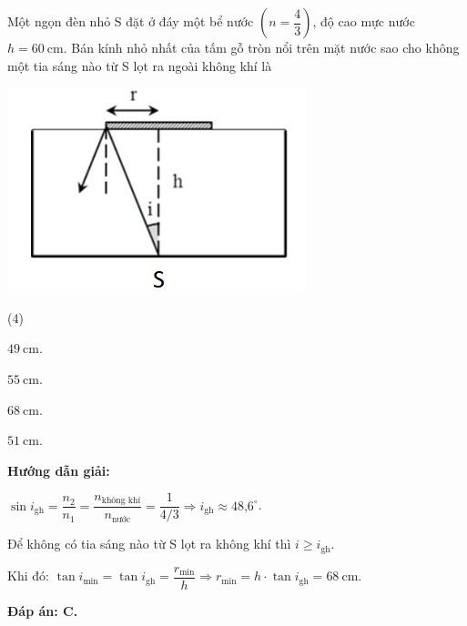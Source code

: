 {Một ngọn đèn nhỏ S đặt ở đáy một bể nước $\left( n=\dfrac{4}{3}\right) $, độ cao mực nước $h=60\ \text{cm}$. Bán kính nhỏ nhất của tấm gỗ tròn nổi trên mặt nước sao cho không một tia sáng nào từ S lọt ra ngoài không khí là
\begin{center}
	\includegraphics[scale=0.8]{../figs/VN11-PH-35-L-024-1-h61.jpg}
\end{center}
\begin{mcq}(4)
	\item $49\ \text{cm}$.
	\item $55\ \text{cm}$.
	\item $68\ \text{cm}$. 
	\item $51\ \text{cm}$. 
\end{mcq}}
{\begin{center}
	\textbf{Hướng dẫn giải:}
\end{center}

	$\sin i_\text{gh}=\dfrac{n_2}{n_1}=\dfrac{n_{\text{không khí}}}{n_{\text{nước}}}=\dfrac{1}{\text{4/3}}\Rightarrow i_\text{gh}\approx \text{48,6}^\circ$.
	
	Để không có tia sáng nào từ S lọt ra không khí thì $i\geq i_{\text{gh}}$.
	
	Khi đó: $\tan i_{\text{min}}=\tan i_{\text{gh}}=\dfrac{r_\text{min}}{h}\Rightarrow r_\text{min}=h\cdot \tan i_{\text{gh}}=68\ \text{cm}$.
	
\textbf{	Đáp án: C.}

}
